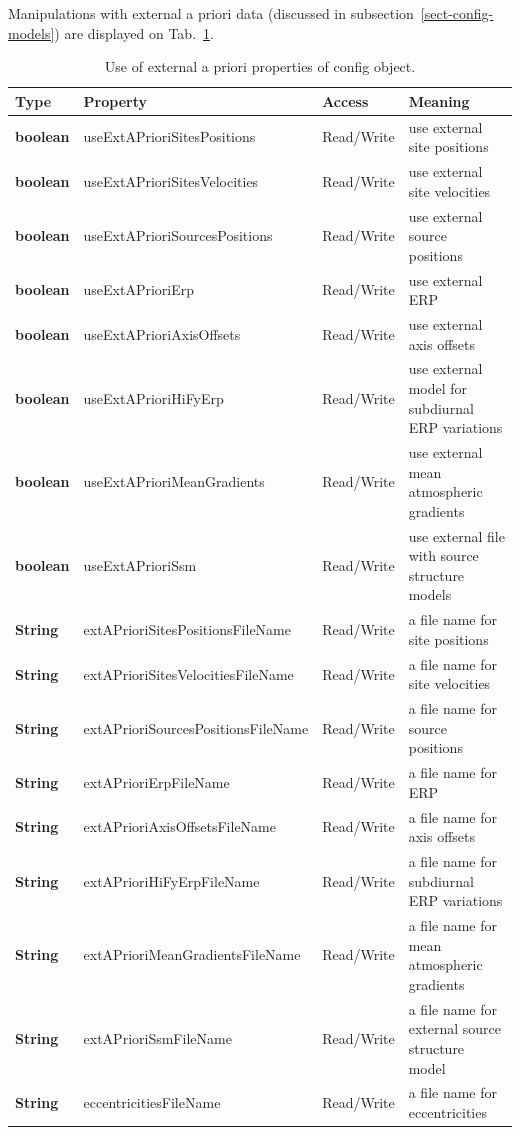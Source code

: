 \documentclass [10pt,letterpaper]{report}
\begin{document}
Manipulations with external a priori data (discussed in subsection~\ref{sect-config-models}) are
displayed on Tab.~\ref{tab-scr-config-properties-4}.

\begin{table}[htb]
\centering
\footnotesize
\begin{tabular}{lllp{}}
\hline
Type & Property & Access & Meaning\\
\hline
  {\bf boolean} & useExtAPrioriSitesPositions & Read/Write & use external site positions\\
  {\bf boolean} & useExtAPrioriSitesVelocities & Read/Write & use external site velocities\\
  {\bf boolean} & useExtAPrioriSourcesPositions & Read/Write & use external source positions\\
  {\bf boolean} & useExtAPrioriErp & Read/Write & use external ERP\\
  {\bf boolean} & useExtAPrioriAxisOffsets & Read/Write & use external axis offsets\\
  {\bf boolean} & useExtAPrioriHiFyErp & Read/Write & use external model for subdiurnal ERP variations\\
  {\bf boolean} & useExtAPrioriMeanGradients & Read/Write & use external mean atmospheric gradients\\
  {\bf boolean} & useExtAPrioriSsm & Read/Write & use external file with source structure models\\
  {\bf String} & extAPrioriSitesPositionsFileName & Read/Write & a file name for site positions\\
  {\bf String} & extAPrioriSitesVelocitiesFileName & Read/Write & a file name for site velocities\\
  {\bf String} & extAPrioriSourcesPositionsFileName & Read/Write & a file name for source positions\\
  {\bf String} & extAPrioriErpFileName & Read/Write & a file name for ERP\\
  {\bf String} & extAPrioriAxisOffsetsFileName & Read/Write & a file name for axis offsets\\
  {\bf String} & extAPrioriHiFyErpFileName & Read/Write & a file name for subdiurnal ERP variations\\
  {\bf String} & extAPrioriMeanGradientsFileName & Read/Write & a file name for mean atmospheric gradients\\
  {\bf String} & extAPrioriSsmFileName & Read/Write & a file name for external source structure model\\
  {\bf String} & eccentricitiesFileName & Read/Write & a file name for eccentricities\\
\hline
\end{tabular}
\caption{Use of external a priori properties of config object.}
\label{tab-scr-config-properties-4}
\end{table}
\end{document}
